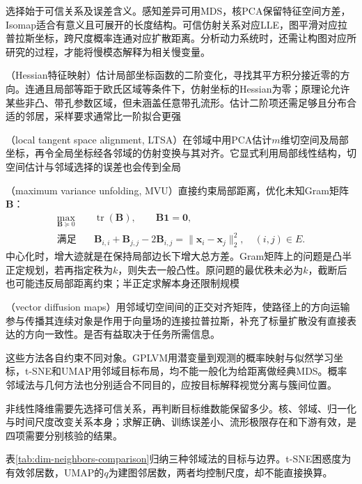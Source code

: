 选择始于可信关系及误差含义。感知差异可用MDS，核PCA保留特征空间方差，Isomap适合有意义且可展开的长度结构。可信仿射关系对应LLE，图平滑对应拉普拉斯坐标，跨尺度概率连通对应扩散距离。分析动力系统时，还需让构图对应所研究的过程，才能将慢模态解释为相关慢变量。

（Hessian特征映射）估计局部坐标函数的二阶变化，寻找其平方积分接近零的方向。连通且局部等距于欧氏区域等条件下，仿射坐标的Hessian为零；原理论允许某些非凸、带孔参数区域，但未涵盖任意带孔流形。估计二阶项还需足够且分布合适的邻居，采样要求通常比一阶拟合更强

（local tangent space alignment, LTSA）在邻域中用PCA估计$m$维切空间及局部坐标，再令全局坐标经各邻域的仿射变换与其对齐。它显式利用局部线性结构，切空间估计与邻域选择的误差也会传到全局

（maximum variance unfolding, MVU）直接约束局部距离，优化未知Gram矩阵$\bm{B}$：
\[
  \begin{aligned}
    \max_{\bm{B}\succeq0}\quad&
      \operatorname{tr}(\bm{B}),\qquad \bm{B}\bm{1}=\bm{0},\\
    \text{满足}\quad&
      \bm{B}_{i,i}+\bm{B}_{j,j}-2\bm{B}_{i,j}
      =\lVert\bm{x}_i-\bm{x}_j\rVert_2^2,\quad(i,j)\in E.
  \end{aligned}
\]
中心化时，增大迹就是在保持局部边长下增大总方差。Gram矩阵上的问题是凸半正定规划，若再指定秩为$k$，则失去一般凸性。原问题的最优秩未必为$k$，截断后也可能违反局部距离约束；半正定求解本身还限制规模

（vector diffusion maps）用邻域切空间间的正交对齐矩阵，使路径上的方向运输参与传播其连续对象是作用于向量场的连接拉普拉斯，补充了标量扩散没有直接表达的方向一致性。是否有益取决于任务所需信息。

这些方法各自约束不同对象。GPLVM用潜变量到观测的概率映射与似然学习坐标，t-SNE和UMAP用邻域目标布局，均不能一般化为给距离做经典MDS。概率邻域法与几何方法也分别适合不同目的，应按目标解释视觉分离与簇间位置。

非线性降维需要先选择可信关系，再判断目标维数能保留多少。核、邻域、归一化与时间尺度改变关系本身；求解正确、训练误差小、流形极限存在和下游有效，是四项需要分别核验的结果。

表\ref{tab:dim-neighbors-comparison}归纳三种邻域法的目标与边界。t-SNE困惑度为有效邻居数，UMAP的$q$为建图邻居数，两者均控制尺度，却不能直接换算。

